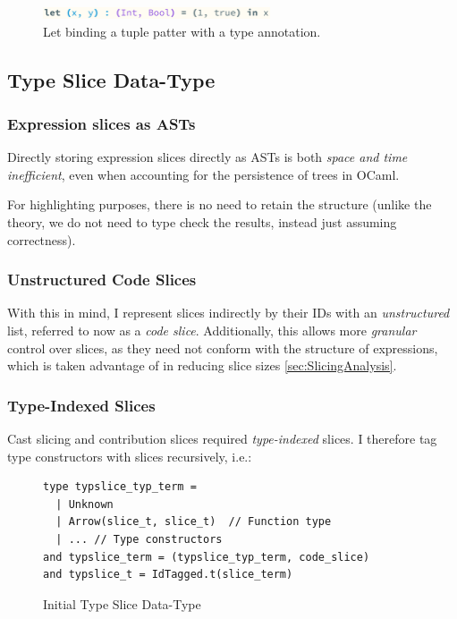 \begin{figure}[h]
\center\includegraphics[width=0.6\textwidth]{Media/Figures/tuple_term_structure}
\caption{Let binding a tuple patter with a type annotation.}
\label{fig:tupletermstructure}
\end{figure}
 
\subsection{Type Slice Data-Type}\label{sec:TypeSliceDataType}

\subsubsection{Expression slices as ASTs}

Directly storing expression slices directly as ASTs is both \textit{space and time inefficient}, even when accounting for the persistence \cite[ch. 2]{PurelyFunctionalDataStructures} of trees in OCaml. 

For highlighting purposes, there is no need to retain the structure (unlike the theory, we do not need to type check the results, instead just assuming correctness). 

\subsubsection{Unstructured Code Slices}
\label{sec:UnstructuredSlices}
With this in mind, I represent slices indirectly by their IDs with an \textit{unstructured} list, referred to now as a \textit{code slice}. Additionally, this allows more \textit{granular} control over slices, as they need not conform with the structure of expressions, which is taken advantage of in reducing slice sizes \cref{sec:SlicingAnalysis}.

\subsubsection{Type-Indexed Slices}
Cast slicing and contribution slices required \textit{type-indexed} slices. I therefore tag type constructors with slices recursively, i.e.:

\begin{figure}[h]
\begin{verbatim}
type typslice_typ_term = 
  | Unknown
  | Arrow(slice_t, slice_t)  // Function type
  | ... // Type constructors
and typslice_term = (typslice_typ_term, code_slice)
and typslice_t = IdTagged.t(slice_term)
\end{verbatim}
\caption{Initial Type Slice Data-Type}
\end{figure}

